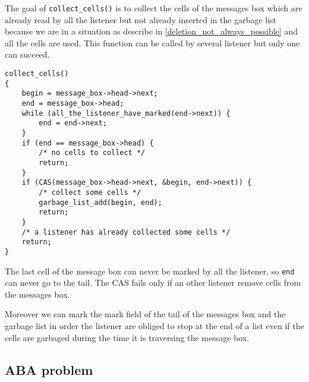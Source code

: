 The goal of \verb|collect_cells()| is to collect the cells of the messages box which are 
already read by all the listener but not already inserted in the garbage list because we are
in a situation as describe in \ref{deletion_not_always_possible} and all the cells are used.
This function can be called by several listener but only one can succeed.

\begin{verbatim}
collect_cells()
{
    begin = message_box->head->next; 
    end = message_box->head;
    while (all_the_listener_have_marked(end->next)) {
        end = end->next;
    }
    if (end == message_box->head) {
        /* no cells to collect */
        return;
    }
    if (CAS(message_box->head->next, &begin, end->next)) {
        /* collect some cells */
        garbage_list_add(begin, end);
        return;
    } 
    /* a listener has already collected some cells */
    return;
}

\end{verbatim}

The last cell of the message box can never be marked by all the listener, so
\verb|end| can never go to the tail. The CAS fails only if an other listener 
remove cells from the messages box.

Moreover we can mark the mark field of the tail of the messages box and the garbage list 
in order the listener are obliged to stop at the end of a list even if the cells
are garbaged during the time it is traversing the message box.


\subsection{ABA problem}
